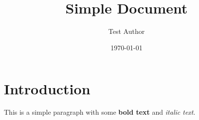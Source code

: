 \documentclass{article}
\title{Simple Document}
\author{Test Author}
\date{\today}
\begin{document}
\maketitle

\section{Introduction}
This is a simple paragraph with some \textbf{bold text} and \textit{italic text}.
\end{document}
